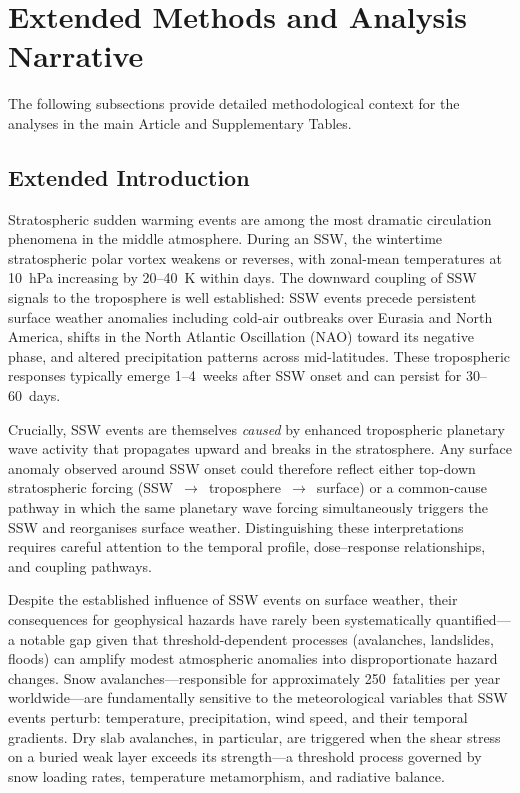 \documentclass[11pt,letterpaper]{article}
\begin{document}
\section*{Extended Methods and Analysis Narrative}

The following subsections provide detailed methodological context for the analyses in the main Article and Supplementary Tables.

\subsection*{Extended Introduction}

Stratospheric sudden warming events are among the most dramatic circulation phenomena in the middle atmosphere. During an SSW, the wintertime stratospheric polar vortex weakens or reverses, with zonal-mean temperatures at 10~hPa increasing by 20--40~K within days\cite{Matsuno1971,Charlton2007}. The downward coupling of SSW signals to the troposphere is well established: SSW events precede persistent surface weather anomalies including cold-air outbreaks over Eurasia and North America, shifts in the North Atlantic Oscillation (NAO) toward its negative phase, and altered precipitation patterns across mid-latitudes\cite{Baldwin2001,Thompson2002,Kidston2015}. These tropospheric responses typically emerge 1--4~weeks after SSW onset and can persist for 30--60~days\cite{Sigmond2013}.

Crucially, SSW events are themselves \emph{caused} by enhanced tropospheric planetary wave activity that propagates upward and breaks in the stratosphere\cite{Matsuno1971,Polvani2004}. Any surface anomaly observed around SSW onset could therefore reflect either top-down stratospheric forcing (SSW~$\to$~troposphere~$\to$~surface) or a common-cause pathway in which the same planetary wave forcing simultaneously triggers the SSW and reorganises surface weather. Distinguishing these interpretations requires careful attention to the temporal profile, dose--response relationships, and coupling pathways.

Despite the established influence of SSW events on surface weather, their consequences for geophysical hazards have rarely been systematically quantified---a notable gap given that threshold-dependent processes (avalanches, landslides, floods) can amplify modest atmospheric anomalies into disproportionate hazard changes. Snow avalanches---responsible for approximately 250~fatalities per year worldwide\cite{Techel2016}---are fundamentally sensitive to the meteorological variables that SSW events perturb: temperature, precipitation, wind speed, and their temporal gradients\cite{Schweizer2003,Schweizer2008}. Dry slab avalanches, in particular, are triggered when the shear stress on a buried weak layer exceeds its strength---a threshold process governed by snow loading rates, temperature metamorphism, and radiative balance\cite{McClung2006,Reuter2018}.
\end{document}
